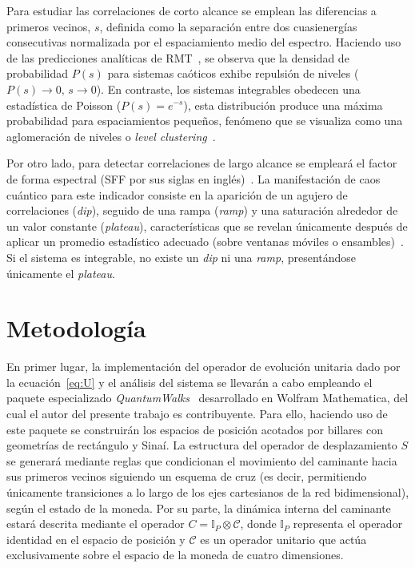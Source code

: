 \documentclass[11pt,a4paper]{article}  %
\begin{document}
Para estudiar las correlaciones de corto alcance se emplean las diferencias a primeros vecinos, $s$, definida como la separación entre dos cuasienergías consecutivas normalizada por el espaciamiento medio del espectro. 
Haciendo uso de las predicciones analíticas de RMT~\cite{wigner1951statistical,mehta1991random}, se observa que la densidad de probabilidad $P(s)$ para sistemas caóticos exhibe repulsión de niveles ($P(s)\rightarrow 0,\, s\rightarrow 0$). En contraste, los sistemas integrables obedecen una estadística de Poisson ($P(s) = e^{-s}$), esta distribución produce una máxima probabilidad para espaciamientos pequeños, fenómeno que se visualiza como una aglomeración de niveles o \textit{level clustering}~\cite{mehta1991random,alonso-lobo2025simplest}.

Por otro lado, para detectar correlaciones de largo alcance se empleará el factor de forma espectral (SFF por sus siglas en inglés)~\cite{haake2018quantum}. La manifestación de caos cuántico para este indicador consiste en la aparición de un agujero de correlaciones (\textit{dip}), seguido de una rampa (\textit{ramp}) y una saturación alrededor de un valor constante (\textit{plateau}), características que se revelan únicamente después de aplicar un promedio estadístico adecuado (sobre ventanas móviles o ensambles)~\cite{haake2018quantum}.
Si el sistema es integrable, no existe un \textit{dip} ni una \textit{ramp}, presentándose únicamente el \textit{plateau}. 
\section{Metodología}  %

En primer lugar, la implementación del operador de evolución unitaria dado por la ecuación~\eqref{eq:U} y el análisis del sistema se llevarán a cabo empleando el paquete especializado \textit{QuantumWalks}~\cite{quantumwalks} desarrollado en Wolfram Mathematica, del cual el autor del presente trabajo es contribuyente. 
Para ello, haciendo uso de este paquete se construirán los espacios de posición acotados por billares con geometrías de rectángulo y Sinaí. La estructura del operador de desplazamiento $S$ se generará mediante reglas que condicionan el movimiento del caminante hacia sus primeros vecinos siguiendo un esquema de cruz (es decir, permitiendo únicamente transiciones a lo largo de los ejes cartesianos de la red bidimensional), según el estado de la moneda.
Por su parte, la dinámica interna del caminante estará descrita mediante el operador $C = \mathbb{I}_P \otimes \mathcal{C}$, donde $\mathbb{I}_P$ representa el operador identidad en el espacio de posición y $\mathcal{C}$ es un operador unitario que actúa exclusivamente sobre el espacio de la moneda de cuatro dimensiones.
\end{document}
